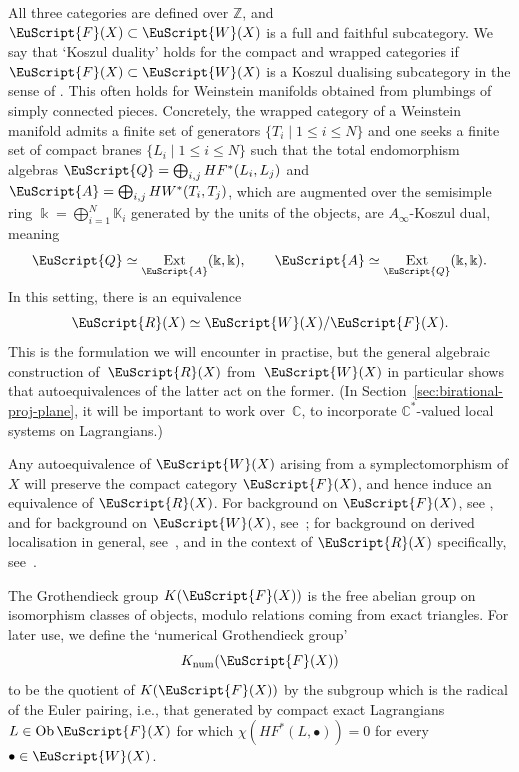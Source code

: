 \documentclass[pdftex]{sigma}
\DeclareMathOperator{\Ext}{Ext}
\def\scrA{\EuScript{A}}
\def\scrQ{\EuScript{Q}}
\def\scrR{\EuScript{R}}
\newcommand{\scrF}{\EuScript{F}}
\def\scrW{\EuScript{W}}
\def\bK{\mathbb{K}}
\def\bZ{\mathbb{Z}}
\def\bC{\mathbb{C}}
\theoremstyle{definition}
\numberwithin{equation}{section}
\begin{document}
All three categories are defined over $\bZ$, and $\scrF(X) \subset \scrW(X)$ is a full and faithful subcategory. We say that `Koszul duality' holds for the compact and wrapped categories if $\scrF(X) \subset \scrW(X)$ is a Koszul dualising subcategory in the sense of \cite[Definition~2.12]{GGV}. This often holds for Weinstein manifolds obtained from plumbings of simply connected pieces. Concretely, the wrapped category of a Weinstein manifold admits a finite set of generators $\{T_i \mid 1 \leq i \leq N\}$ and one seeks a finite set of compact branes $\{L_i \mid 1 \leq i \leq N\}$ such that the total endomorphism algebras $\scrQ = \bigoplus_{i,j} HF^*(L_i,L_j)$ and $\scrA = \bigoplus_{i,j} HW^*(T_i,T_j)$, which are augmented over the semisimple ring $\Bbbk = \bigoplus_{i=1}^N \bK_i$ generated by the units of the objects, are $A_{\infty}$-Koszul dual, meaning
\[
\scrQ \simeq \Ext_{\scrA}(\Bbbk,\Bbbk), \qquad \scrA \simeq \Ext_{\scrQ}(\Bbbk,\Bbbk).
\]
In this setting, there is an equivalence \cite[Corollary~1.4]{GGV}
\[
\scrR(X) \simeq \scrW(X) / \scrF(X).
\]
This is the formulation we will encounter in practise, but the general algebraic construction of~$\scrR(X)$ from~$\scrW(X)$ in particular shows that autoequivalences of the latter act on the former.
 (In Section~\ref{sec:birational-proj-plane}, it will be important to work over~$\bC$, to incorporate $\bC^*$-valued local systems on Lagrangians.)

 Any autoequivalence of $\scrW(X)$ arising from a symplectomorphism of $X$ will preserve the compact category $\scrF(X)$, and hence induce an equivalence of $\scrR(X)$. For background on $\scrF(X)$, see \cite{Seidel:FCPLT}, and for background on $\scrW(X)$, see~\cite{Abouzaid-Seidel:Viterbo}; for background on derived localisation in general, see~\cite{Drinfeld}, and in the context of $\scrR(X)$ specifically, see~\cite{GGV}.

The Grothendieck group $K(\scrF(X))$ is the free abelian group on isomorphism classes of objects, modulo relations coming from exact triangles.
For later use, we define the `numerical Grothendieck group'
\begin{equation}\label{eqn:Knum}
K_{\rm num}(\scrF(X))
\end{equation}
to be the quotient of $K(\scrF(X))$ by the subgroup which is the radical of the Euler pairing, i.e., that generated by compact exact Lagrangians $L \in \mathrm{Ob}\,\scrF(X)$ for which $\chi(HF^*(L,\bullet)) = 0$ for every $\bullet \in \scrW(X)$.
\end{document}
